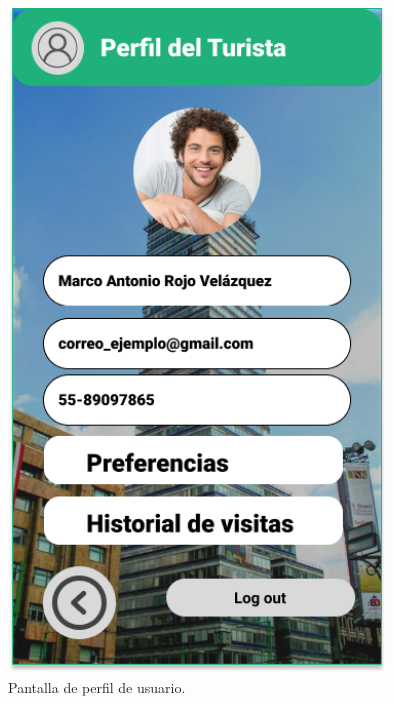 \begin{figure}[htb]
    \centering
    \includegraphics[width=10cm]{pantalla12.png}
    \caption{Pantalla de perfil de usuario.}
    \label{fig:enter-label}
\end{figure}

